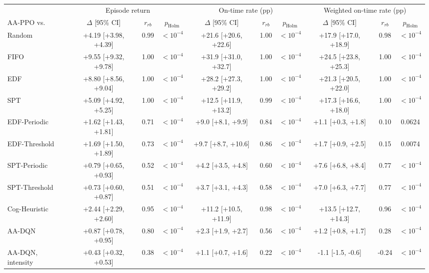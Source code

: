 \begin{tabular}{lccccccccc}
\toprule
 & \multicolumn{3}{c}{Episode return} & \multicolumn{3}{c}{On-time rate (pp)} & \multicolumn{3}{c}{Weighted on-time rate (pp)} \\
\cmidrule(lr){2-4}\cmidrule(lr){5-7}\cmidrule(lr){8-10}
AA-PPO vs. & $\Delta$ [95\% CI] & $r_{rb}$ & $p_{\mathrm{Holm}}$ & $\Delta$ [95\% CI] & $r_{rb}$ & $p_{\mathrm{Holm}}$ & $\Delta$ [95\% CI] & $r_{rb}$ & $p_{\mathrm{Holm}}$ \\
\midrule
Random & +4.19 [+3.98, +4.39] & 0.99 & $<10^{-4}$ & +21.6 [+20.6, +22.6] & 1.00 & $<10^{-4}$ & +17.9 [+17.0, +18.9] & 0.98 & $<10^{-4}$ \\
FIFO & +9.55 [+9.32, +9.78] & 1.00 & $<10^{-4}$ & +31.9 [+31.0, +32.7] & 1.00 & $<10^{-4}$ & +24.5 [+23.8, +25.3] & 1.00 & $<10^{-4}$ \\
EDF & +8.80 [+8.56, +9.04] & 1.00 & $<10^{-4}$ & +28.2 [+27.3, +29.2] & 1.00 & $<10^{-4}$ & +21.3 [+20.5, +22.0] & 1.00 & $<10^{-4}$ \\
SPT & +5.09 [+4.92, +5.25] & 1.00 & $<10^{-4}$ & +12.5 [+11.9, +13.2] & 0.99 & $<10^{-4}$ & +17.3 [+16.6, +18.0] & 1.00 & $<10^{-4}$ \\
EDF-Periodic & +1.62 [+1.43, +1.81] & 0.71 & $<10^{-4}$ & +9.0 [+8.1, +9.9] & 0.84 & $<10^{-4}$ & +1.1 [+0.3, +1.8] & 0.10 & 0.0624 \\
EDF-Threshold & +1.69 [+1.50, +1.89] & 0.73 & $<10^{-4}$ & +9.7 [+8.7, +10.6] & 0.86 & $<10^{-4}$ & +1.7 [+0.9, +2.5] & 0.15 & 0.0074 \\
SPT-Periodic & +0.79 [+0.65, +0.93] & 0.52 & $<10^{-4}$ & +4.2 [+3.5, +4.8] & 0.60 & $<10^{-4}$ & +7.6 [+6.8, +8.4] & 0.77 & $<10^{-4}$ \\
SPT-Threshold & +0.73 [+0.60, +0.87] & 0.51 & $<10^{-4}$ & +3.7 [+3.1, +4.3] & 0.58 & $<10^{-4}$ & +7.0 [+6.3, +7.7] & 0.77 & $<10^{-4}$ \\
Cog-Heuristic & +2.44 [+2.29, +2.60] & 0.95 & $<10^{-4}$ & +11.2 [+10.5, +11.9] & 0.98 & $<10^{-4}$ & +13.5 [+12.7, +14.3] & 0.96 & $<10^{-4}$ \\
AA-DQN & +0.87 [+0.78, +0.95] & 0.80 & $<10^{-4}$ & +2.3 [+1.9, +2.7] & 0.56 & $<10^{-4}$ & +1.2 [+0.8, +1.7] & 0.28 & $<10^{-4}$ \\
AA-DQN, intensity & +0.43 [+0.32, +0.53] & 0.38 & $<10^{-4}$ & +1.1 [+0.7, +1.6] & 0.22 & $<10^{-4}$ & -1.1 [-1.5, -0.6] & -0.24 & $<10^{-4}$ \\
\bottomrule
\end{tabular}